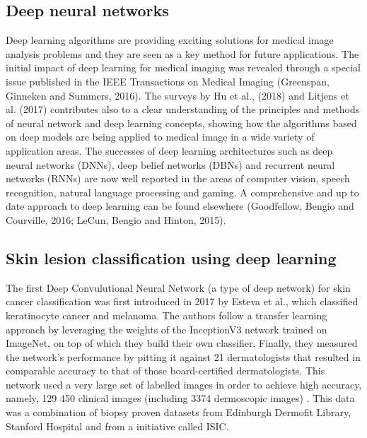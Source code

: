 \documentclass[journal,compsoc]{IEEEtran}
\begin{document}
\subsection{Deep neural networks}
Deep learning algorithms are providing exciting solutions for medical image analysis problems and they are seen as a key method for future applications. The initial impact of deep learning for medical imaging was revealed through a special issue published in the IEEE Transactions on Medical Imaging (Greenspan, Ginneken and Summers, 2016).
The surveys by Hu et al., (2018) and Litjens et al. (2017) contributes also to a clear understanding of the principles and methods of neural network and deep learning concepts, showing how the algorithms based on deep models are being applied to medical image in a wide variety of application areas.
The successes of deep learning architectures such as deep neural networks (DNNs), deep belief networks (DBNs) and recurrent neural networks (RNNs) are now well reported in the areas of computer vision, speech recognition, natural language processing and gaming. A comprehensive and up to date approach to deep learning can be found elsewhere (Goodfellow, Bengio and Courville, 2016; LeCun, Bengio and Hinton, 2015). 
\subsection{Skin lesion classification using deep learning}
The first Deep Convulutional Neural Network (a type of deep  network) for skin cancer classification was first introduced in 2017 by Esteva et al.\cite{Esteva2017}, which classified keratinocyte cancer and melanoma. The authors follow a transfer learning approach by leveraging the weights of the InceptionV3 network trained on ImageNet, on top of which they build their own classifier. Finally, they measured the network's performance by pitting it against 21 dermatologists that resulted in comparable accuracy to that of those board-certified dermatologists. This network used a very large set of labelled images in order to achieve high accuracy, namely, 129 450 clinical images (including 3374 dermoscopic images) \cite{Esteva2017}. This data was a combination of biopsy proven datasets from Edinburgh Dermofit Library, Stanford Hospital and from a initiative called ISIC. \par
\end{document}
